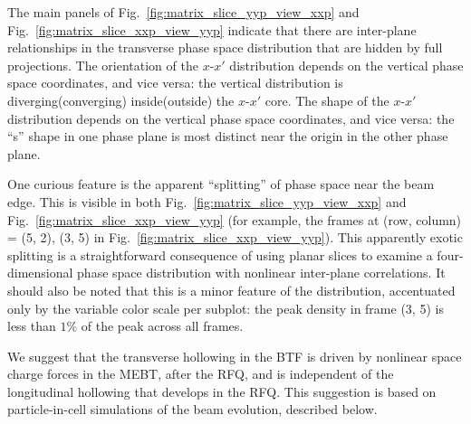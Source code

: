 \documentclass[%
 reprint,
 amsmath,amssymb,
 aps,
prstab,
]{revtex4-2}
\begin{document}
The main panels of Fig.~\ref{fig:matrix_slice_yyp_view_xxp} and Fig.~\ref{fig:matrix_slice_xxp_view_yyp} indicate that there are inter-plane relationships in the transverse phase space distribution that are hidden by full projections. The orientation of the $x$-$x'$ distribution depends on the vertical phase space coordinates, and vice versa: the vertical distribution is diverging(converging) inside(outside) the $x$-$x'$ core. The shape of the $x$-$x'$ distribution depends on the vertical phase space coordinates, and vice versa: the ``s'' shape in one phase plane is most distinct near the origin in the other phase plane. 

One curious feature is the apparent ``splitting'' of phase space near the beam edge. This is visible in both Fig.~\ref{fig:matrix_slice_yyp_view_xxp} and Fig.~\ref{fig:matrix_slice_xxp_view_yyp} (for example, the frames at (row, column) = (5, 2), (3, 5) in Fig.~\ref{fig:matrix_slice_xxp_view_yyp}). This apparently exotic splitting is a straightforward consequence of using planar slices to examine a four-dimensional phase space distribution with nonlinear inter-plane correlations. It should also be noted that this is a minor feature of the distribution, accentuated only by the variable color scale per subplot: the peak density in frame (3, 5) is less than $1\%$ of the peak across all frames.

We suggest that the transverse hollowing in the BTF is driven by nonlinear space charge forces in the MEBT, after the RFQ, and is independent of the longitudinal hollowing that develops in the RFQ. This suggestion is based on particle-in-cell simulations of the beam evolution, described below.
\end{document}
